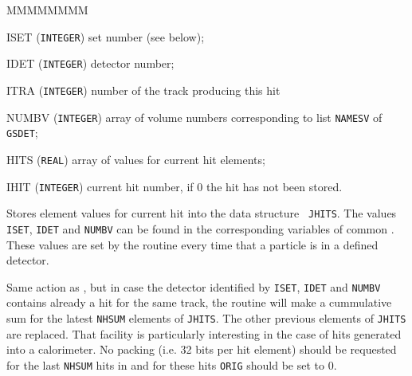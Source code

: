                    
                   


\begin{DLtt}{MMMMMMMM}
\item[ISET]  ({\tt INTEGER}) set number (see below);
\item[IDET]  ({\tt INTEGER}) detector number;
\item[ITRA]  ({\tt INTEGER}) number of the track producing this hit
\item[NUMBV] ({\tt INTEGER}) array of volume numbers corresponding 
to list {\tt NAMESV} of {\tt GSDET};
\item[HITS] ({\tt REAL}) array of values for current hit elements;
\item[IHIT] ({\tt INTEGER}) current hit number, if 0 the
hit has not been stored.
\end{DLtt}

Stores element values for current hit into the data structure {\tt
JHITS}. The values {\tt ISET}, {\tt IDET} and {\tt NUMBV} can be found
in the corresponding variables of common . These values
are set by the routine  every time that a particle is in
a defined detector.

Same action as , but in case the detector identified by
{\tt ISET}, {\tt IDET} and
{\tt NUMBV} contains already a hit for the same track, the routine will
make a cummulative sum for the latest {\tt NHSUM} elements of {\tt JHITS}.
The other previous elements of {\tt JHITS} are replaced.
That facility is particularly interesting in the case of
hits generated into a calorimeter. No packing (i.e. 32 bits per
hit element) should be requested for the
last {\tt NHSUM} hits in  and for these hits {\tt ORIG} should
be set to 0.

